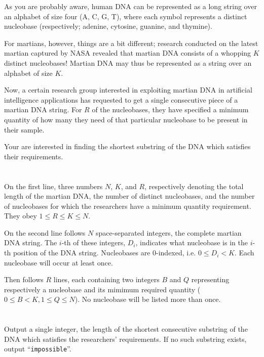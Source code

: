\ifx\boi\undefined\fi
\def\version{jury-1}
As you are probably aware, human DNA can be represented as a long string over
an alphabet of size four ({A, C, G, T}), where each symbol represents a
distinct nucleobase (respectively; adenine, cytosine, guanine, and thymine).

For martians, however, things are a bit different; research conducted on the
latest martian captured by NASA revealed that martian DNA consists of a
whopping $K$ distinct nucleobases! Martian DNA may thus be represented as a
string over an alphabet of size $K$.

Now, a certain research group interested in exploiting martian DNA in
artificial intelligence applications has requested to get a single consecutive
piece of a martian DNA string. For $R$ of the nucleobases, they have specified
a minimum quantity of how many they need of that particular nucleobase to be
present in their sample.

Your are interested in finding the shortest substring of the DNA which satisfies their requirements.

\section*{}
On the first line, three numbers $N$, $K$, and $R$, respectively denoting the
total length of the martian DNA, the number of distinct nucleobases, and the
number of nucleobases for which the researchers have a minimum quantity
requirement. They obey $1 \le R \le K \le N$.

On the second line follows $N$ space-separated integers, the complete martian
DNA string. The $i$-th of these integers, $D_i$, indicates what nucleobase is
in the $i$-th position of the DNA string. Nucleobases are $0$-indexed, i.e. $0
\leq D_i < K$. Each nucleobase will occur at least once.

Then follows $R$ lines, each containing two integers $B$ and $Q$ representing
respectively a nucleobase and its mimimum required quantity ($0 \le B < K, 1 \le Q \le N$).
No nucleobase will be listed more than once.

\section*{\outputsection}
Output a single integer, the length of the shortest consecutive substring of
the DNA which satisfies the researchers' requirements. If no such substring
exists, output ``\texttt{impossible}''.

